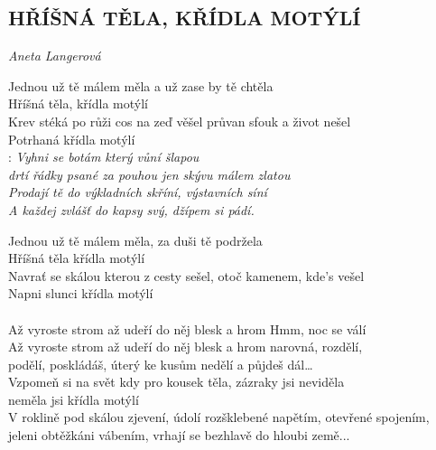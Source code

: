 \begin{flushleft}
	\section*{\Huge HŘÍŠNÁ TĚLA, KŘÍDLA MOTÝLÍ}
	\emph{Aneta Langerová}
\end{flushleft}
\begin{Large}

Jednou už tě málem měla a už zase by tě chtěla\\
Hříšná těla, křídla motýlí\\
Krev stéká po růži cos na zeď věšel
průvan sfouk a život nešel\\
Potrhaná křídla motýlí\\

\textregistered:
\emph{
Vyhni se botám který vůní šlapou\\
drtí řádky psané za pouhou jen skývu málem zlatou\\
Prodají tě do výkladních skříní, výstavních síní\\
A každej zvlášť do kapsy svý, džípem si pádí.\\
}

Jednou už tě málem měla, za duši tě podržela\\
Hříšná těla křídla motýlí\\
Navrať se skálou kterou z cesty sešel, otoč kamenem, kde's vešel\\
Napni slunci křídla motýlí \hspace{1 cm}\\

\textregistered\\

Až vyroste strom až udeří do něj blesk a hrom Hmm, noc se válí\\
Až vyroste strom až udeří do něj blesk a hrom narovná, rozdělí,\\
podělí, poskládáš, úterý ke kusům nedělí a půjdeš dál… \\

Vzpomeň si na svět kdy pro kousek těla, zázraky jsi neviděla\\
neměla jsi křídla motýlí\\

V roklině pod skálou zjevení, údolí rozšklebené napětím, otevřené spojením,\\
jeleni obtěžkáni vábením,
vrhají se bezhlavě do hloubi země...

\end{Large}
\newpage
